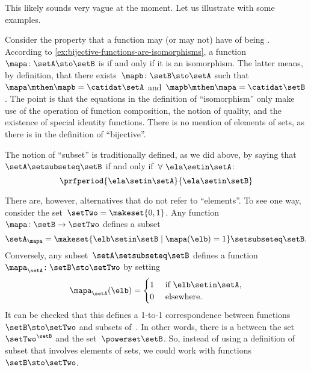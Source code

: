 This likely sounds very vague at the moment.
Let us illustrate with some examples.

\begin{example}
    Consider the property that a function may (or may not) have of being .
    According to \cref{ex:bijective-functions-are-isomorphisms}, a function~$\mapa\colon \setA \sto \setB$ is  if and only if it is an isomorphism.
    The latter means, by definition, that there exists~$\mapb \colon \setB \sto \setA$ such that~$\mapa \mthen \mapb = \catidat\setA$ and~$\mapb \mthen \mapa = \catidat\setB$.
    The point is that the equations in the definition of ``isomorphism'' only make use of the operation of function composition, the notion of quality, and the existence of special identity functions.
    There is no mention of elements of sets, as there is in the definition of ``bijective''.
\end{example}

\begin{example}
    The notion of ``subset'' is traditionally defined, as we did above, by saying that~$\setA \setsubseteq \setB$ if and only if~$\forall \ \ela \setin\setA$:
    \begin{equation}
        \prfperiod{
            \ela \setin\setA
        }{
            \ela \setin\setB
        }
    \end{equation}

    There are, however, alternatives that do not refer to ``elements''.
    To see one way, consider the set~$\setTwo = \makeset{ 0, 1}$.
    Any function~$\mapa \colon \setB \to \setTwo$ defines a subset
    \begin{equation}
        \setA_\mapa = \makeset{ \elb \setin\setB \mid \mapa(\elb) = 1 } \setsubseteq \setB.
    \end{equation}
    Conversely, any subset~$\setA \setsubseteq \setB$ defines a function~$\mapa_\setA \colon \setB \sto \setTwo$ by setting
    \begin{equation}
        \mapa_\setA(\elb) = \begin{cases}
            1 & \text{ if }\elb\setin\setA, \\
            0 & \text{ elsewhere}.
        \end{cases}
    \end{equation}
    It can be checked that this defines a 1-to-1 correspondence between functions~$\setB \sto \setTwo$ and subsets of~\setB.
    In other words, there is a  between the set~$\setTwo^\setB$ and the set~$\powerset \setB$.
    So, instead of using a definition of subset that involves elements of sets, we could work with functions~$\setB \sto \setTwo$.
\end{example}

